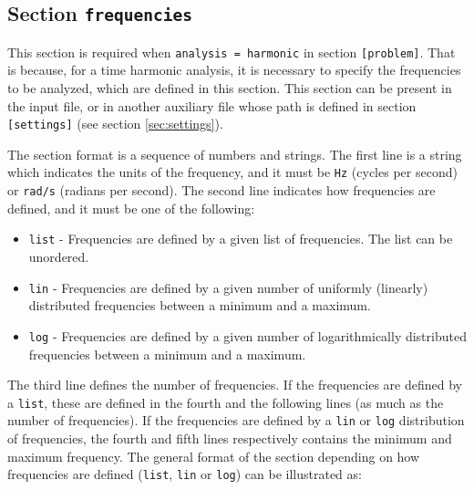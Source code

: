 \documentclass[a4paper,fleqn]{book}
\begin{document}
\subsection{Section \texttt{frequencies}}
\label{sec:frequencies}

This section is required when \texttt{analysis = harmonic} in section \texttt{[problem]}. That is because, for a time harmonic analysis, it is necessary to specify the frequencies to be analyzed, which are defined in this section. This section can be present in the input file, or in another auxiliary file whose path is defined in section  \texttt{[settings]} (see section \ref{sec:settings}).

The section format is a sequence of numbers and strings. The first line is a string which indicates the units of the frequency, and it must be \texttt{Hz} (cycles per second) or \texttt{rad/s} (radians per second). The second line indicates how frequencies are defined, and it must be one of the following:
\begin{itemize}
    \item \texttt{list} - Frequencies are defined by a given list of frequencies. The list can be unordered.
    \item \texttt{lin} - Frequencies are defined by a given number of uniformly (linearly) distributed frequencies between a minimum and a maximum.
    \item \texttt{log} - Frequencies are defined by a given number of logarithmically distributed frequencies between a minimum and a maximum.
\end{itemize}
The third line defines the number of frequencies. If the frequencies are defined by a \texttt{list}, these are defined in the fourth and the following lines (as much as the number of frequencies). If the frequencies are defined by a \texttt{lin} or \texttt{log} distribution of frequencies, the fourth and fifth lines respectively contains the minimum and maximum frequency. The general format of the section depending on how frequencies are defined (\texttt{list}, \texttt{lin} or \texttt{log}) can be illustrated as:
\end{document}
